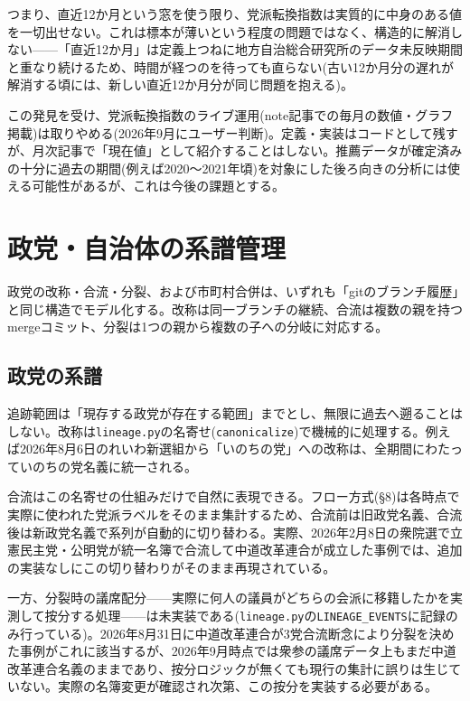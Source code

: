 \documentclass[a4paper,11pt]{ltjsarticle}
\begin{document}
つまり、直近12か月という窓を使う限り、党派転換指数は実質的に中身のある値を一切出せない。これは標本が薄いという程度の問題ではなく、構造的に解消しない——「直近12か月」は定義上つねに地方自治総合研究所のデータ未反映期間と重なり続けるため、時間が経つのを待っても直らない(古い12か月分の遅れが解消する頃には、新しい直近12か月分が同じ問題を抱える)。

この発見を受け、党派転換指数のライブ運用(note記事での毎月の数値・グラフ掲載)は取りやめる(2026年9月にユーザー判断)。定義・実装はコードとして残すが、月次記事で「現在値」として紹介することはしない。推薦データが確定済みの十分に過去の期間(例えば2020〜2021年頃)を対象にした後ろ向きの分析には使える可能性があるが、これは今後の課題とする。

\section{政党・自治体の系譜管理}

政党の改称・合流・分裂、および市町村合併は、いずれも「gitのブランチ履歴」と同じ構造でモデル化する。改称は同一ブランチの継続、合流は複数の親を持つmergeコミット、分裂は1つの親から複数の子への分岐に対応する。

\subsection{政党の系譜}

追跡範囲は「現存する政党が存在する範囲」までとし、無限に過去へ遡ることはしない。改称は\texttt{lineage.py}の名寄せ(\texttt{canonicalize})で機械的に処理する。例えば2026年8月6日のれいわ新選組から「いのちの党」への改称は、全期間にわたっていのちの党名義に統一される。

合流はこの名寄せの仕組みだけで自然に表現できる。フロー方式(\S8)は各時点で実際に使われた党派ラベルをそのまま集計するため、合流前は旧政党名義、合流後は新政党名義で系列が自動的に切り替わる。実際、2026年2月8日の衆院選で立憲民主党・公明党が統一名簿で合流して中道改革連合が成立した事例では、追加の実装なしにこの切り替わりがそのまま再現されている。

一方、分裂時の議席配分——実際に何人の議員がどちらの会派に移籍したかを実測して按分する処理——は未実装である(\texttt{lineage.py}の\texttt{LINEAGE\_EVENTS}に記録のみ行っている)。2026年8月31日に中道改革連合が3党合流断念により分裂を決めた事例がこれに該当するが、2026年9月時点では衆参の議席データ上もまだ中道改革連合名義のままであり、按分ロジックが無くても現行の集計に誤りは生じていない。実際の名簿変更が確認され次第、この按分を実装する必要がある。
\end{document}
